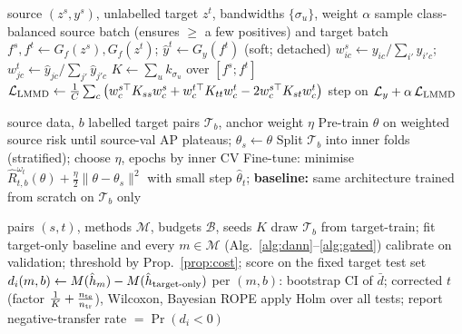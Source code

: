 \documentclass[journal]{IEEEtran}
\newcommand{\1}{\mathbf{1}}
\begin{document}
\begin{algorithm}[t]
\caption{Class-conditional (subdomain) MMD training}\label{alg:lmmd}
\begin{algorithmic}[1]
\Require source $(z^s,y^s)$, unlabelled target $z^t$, bandwidths $\{\sigma_u\}$, weight $\alpha$
  \State sample class-balanced source batch (ensures $\ge$ a few positives) and target batch
  \State $f^s,f^t\gets G_f(z^s),G_f(z^t)$; $\hat y^t\gets G_y(f^t)$ (soft; detached)
  \State $w^s_{ic}\gets y_{ic}/\sum_{i'}y_{i'c}$; $w^t_{jc}\gets\hat y_{jc}/\sum_{j'}\hat y_{j'c}$
  \State $K\gets\sum_u k_{\sigma_u}$ over $[f^s;f^t]$ 
  \State $\mathcal L_{\rm LMMD}\gets\frac1C\sum_c\big(w^{s\top}_cK_{ss}w^s_c+w^{t\top}_cK_{tt}w^t_c-2w^{s\top}_cK_{st}w^t_c\big)$
  \State step on $\mathcal L_y+\alpha\,\mathcal L_{\rm LMMD}$
\EndFor
\end{algorithmic}
\end{algorithm}

\begin{algorithm}[t]
\caption{Gated network: pre-train and L2-SP fine-tune}\label{alg:gated}
\begin{algorithmic}[1]
\Require source data, $b$ labelled target pairs $\mathcal T_b$, anchor weight $\eta$
\State Pre-train $\theta$ on weighted source risk until source-val AP plateaus; $\theta_s\gets\theta$
\State Split $\mathcal T_b$ into inner folds (stratified); choose $\eta$, epochs by inner CV
\State Fine-tune: minimise $\hat R^{\omega_t}_{t,b}(\theta)+\tfrac\eta2\|\theta-\theta_s\|^2$ with small step
\State \Return $\hat\theta_t$; \textbf{baseline:} same architecture trained from scratch on $\mathcal T_b$ only
\end{algorithmic}
\end{algorithm}

\begin{algorithm}[t]
\caption{Transfer-gain evaluation with corrected statistics}\label{alg:eval}
\begin{algorithmic}[1]
\Require pairs $(s,t)$, methods $\mathcal M$, budgets $\mathcal B$, seeds $K$
  \State draw $\mathcal T_b$ from target-train; fit target-only baseline and every $m\in\mathcal M$ (Alg.~\ref{alg:dann}--\ref{alg:gated})
  \State calibrate on validation; threshold by Prop.~\ref{prop:cost}; score on the fixed target test set
  \State $d_i(m,b)\gets M(\hat h_m)-M(\hat h_{\rm target\text{-}only})$
\EndFor
\State per $(m,b)$: bootstrap CI of $\bar d$; corrected $t$ (factor $\tfrac1K+\tfrac{n_{\rm te}}{n_{\rm tr}}$), Wilcoxon, Bayesian ROPE
\State apply Holm over all tests; report negative-transfer rate $=\Pr(d_i<0)$
\end{algorithmic}
\end{algorithm}
\end{document}
